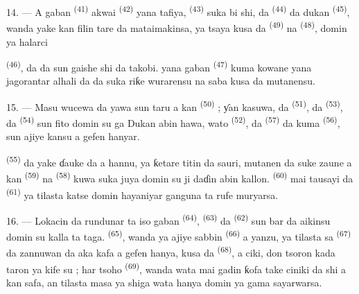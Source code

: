 \VUsaut{3.0mm}

14. --- A gaban  \textsuperscript{(41)} akwai
 \textsuperscript{(42)} yana tafiya,  \textsuperscript{(43)} suka bi shi, da 
\textsuperscript{(44)} da dukan 
 \textsuperscript{(45)}, wanda yake kan filin tare da
mataimakinsa, ya tsaya kusa da 
\textsuperscript{(49)} na  \textsuperscript{(48)}, domin ya
halarci 

 \textsuperscript{(46)}, da  da
 sun gaishe shi da takobi.  yana
gaban  \textsuperscript{(47)} kuma kowane
 yana jagorantar  alhali
 da  da 
suka riƙe wurarensu na saba kusa da mutanensu.

15. --- Masu wucewa da yawa sun taru a kan 
\textsuperscript{(50)} ; ƴan kasuwa, da 
\textsuperscript{(51)}, da  \textsuperscript{(53)}, da
 \textsuperscript{(54)} sun fito domin su ga
 Dukan abin hawa, wato 
\textsuperscript{(52)}, da 
\textsuperscript{(57)} da kuma 
\textsuperscript{(56)}, sun ajiye kansu a gefen hanyar.

\VUsaut{3.0mm}

 \textsuperscript{(55)} da yake ɗauke da
 a hannu, ya ƙetare titin da sauri,
mutanen da suke zaune a kan  \textsuperscript{(59)} na
 \textsuperscript{(58)} kuwa suka juya domin su ji
daɗin abin kallon.  \textsuperscript{(60)} mai tausayi
da  \textsuperscript{(61)} ya tilasta
katse  domin hayaniyar ganguna ta rufe muryarsa.

16. --- Lokacin da rundunar ta iso gaban 
\textsuperscript{(64)},  \textsuperscript{(63)} da
 \textsuperscript{(62)} sun bar  da
aikinsu domin su kalla ta taga. 
\textsuperscript{(65)}, wanda ya ajiye sabbin 
\textsuperscript{(66)} a  yanzu, ya tilasta sa
 \textsuperscript{(67)} da zannuwan da aka kafa a gefen
hanya, kusa da  \textsuperscript{(68)}, a
ciki, don tsoron kada taron ya kife su ; har tsoho  \textsuperscript{(69)}, wanda wata mai gadin ƙofa take ciniki da
shi a kan safa, an tilasta masa ya shiga wata hanya domin ya gama
sayarwarsa.

